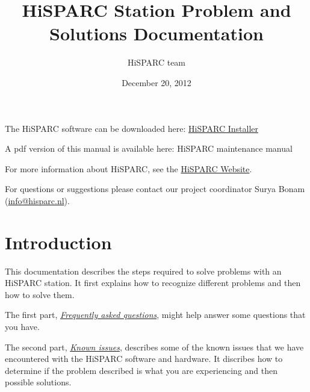 \documentclass[a4paper,11pt,english]{sphinxmanual}
\title{HiSPARC Station Problem and Solutions Documentation}
\date{December 20, 2012}
\author{HiSPARC team}
\begin{document}
\maketitle
\tableofcontents
{}\label{index::doc}


The HiSPARC software can be downloaded here: \href{http://www.hisparc.nl/downloads/software/}{HiSPARC Installer}

A pdf version of this manual is available here: HiSPARC maintenance manual

For more information about HiSPARC, see the \href{http://www.hisparc.nl/}{HiSPARC Website}.

For questions or suggestions please contact our project coordinator
Surya Bonam (\href{mailto:info@hisparc.nl}{info@hisparc.nl}).


\chapter{Introduction}
\label{introduction:introduction}\label{introduction::doc}\label{introduction:welcome-to-the-hisparc-maintenance-documentation}
This documentation describes the steps required to solve problems with an HiSPARC station.  It first explains how to recognize different problems and then how to solve them.

The first part, {\hyperref[faq::doc]{\emph{Frequently asked questions}}}, might help answer some questions that you have.

The second part, {\hyperref[known-issues::doc]{\emph{Known issues}}}, describes some of the known issues that we have encountered with the HiSPARC software and hardware. It discribes how to determine if the problem described is what you are experiencing and then possible solutions.
\end{document}
